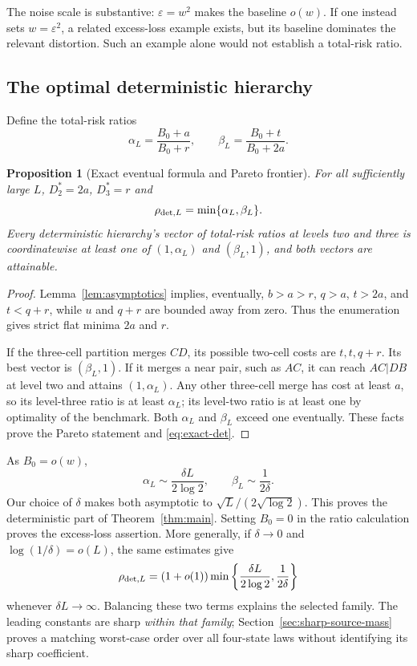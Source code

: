 \documentclass[11pt]{article}
\newtheorem{proposition}[theorem]{Proposition}
\theoremstyle{remark}\newtheorem{remark}[theorem]{Remark}
\begin{document}
The noise scale is substantive: $\varepsilon=w^2$ makes the baseline
$o(w)$. If one instead sets $w=\varepsilon^2$, a related excess-loss
example exists, but its baseline dominates the relevant distortion. Such
an example alone would not establish a total-risk ratio.

\subsection{The optimal deterministic hierarchy}
Define the total-risk ratios
\begin{equation}
 \alpha_L=\frac{B_0+a}{B_0+r},\qquad
 \beta_L=\frac{B_0+t}{B_0+2a}.
 \label{eq:alpha-beta}
\end{equation}
\begin{proposition}[Exact eventual formula and Pareto frontier]
\label{prop:pareto}
For all sufficiently large $L$, $D_2^*=2a$, $D_3^*=r$ and
\begin{equation}
 \rho_{{\rm det},L}=\min\{\alpha_L,\beta_L\}.
 \label{eq:exact-det}
\end{equation}
Every deterministic hierarchy's vector of total-risk ratios at levels two
and three is coordinatewise at least one of
$(1,\alpha_L)$ and $(\beta_L,1)$, and both vectors are attainable.
\end{proposition}
\begin{proof}
Lemma~\ref{lem:asymptotics} implies, eventually,
$b>a>r$, $q>a$, $t>2a$, and $t<q+r$, while $u$ and $q+r$ are bounded
away from zero. Thus the enumeration gives strict flat minima $2a$ and $r$.

If the three-cell partition merges $CD$, its possible two-cell costs are
$t,t,q+r$. Its best vector is $(\beta_L,1)$. If it merges a near pair,
such as $AC$, it can reach $AC|DB$ at level two and attains
$(1,\alpha_L)$. Any other three-cell merge has cost at least $a$, so its
level-three ratio is at least $\alpha_L$; its level-two ratio is at least
one by optimality of the benchmark. Both $\alpha_L$ and $\beta_L$ exceed
one eventually. These facts prove the Pareto statement and
\eqref{eq:exact-det}.
\end{proof}

As $B_0=o(w)$,
\[
 \alpha_L\sim\frac{\delta L}{2\log2},\qquad
 \beta_L\sim\frac1{2\delta}.
\]
Our choice of $\delta$ makes both asymptotic to
$\sqrt L/(2\sqrt{\log2})$. This proves the deterministic part of
Theorem~\ref{thm:main}. Setting $B_0=0$ in the ratio calculation proves
the excess-loss assertion. More generally, if $\delta\to0$ and
$\log(1/\delta)=o(L)$, the same estimates give
\[
 \rho_{{\rm det},L}=(1+o(1))
 \min\left\{\frac{\delta L}{2\log2},\frac1{2\delta}\right\}
\]
whenever $\delta L\to\infty$. Balancing these two terms explains the
selected family. The leading constants are sharp \emph{within that family};
Section~\ref{sec:sharp-source-mass} proves a matching worst-case order
over all four-state laws without identifying its sharp coefficient.
\end{document}
